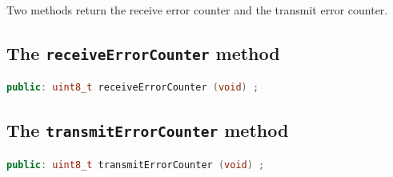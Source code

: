 \documentclass[10pt, a4paper, obeyspaces]{extarticle}
\begin{document}
Two methods return the receive error counter and the transmit error counter.



\subsection{The \texttt{receiveErrorCounter} method}

{ \small\begin{lstlisting}[language=c++]
public: uint8_t receiveErrorCounter (void) ;
\end{lstlisting}}



\subsection{The \texttt{transmitErrorCounter} method}

{ \small\begin{lstlisting}[language=c++]
public: uint8_t transmitErrorCounter (void) ;
\end{lstlisting}}


\end{document}
